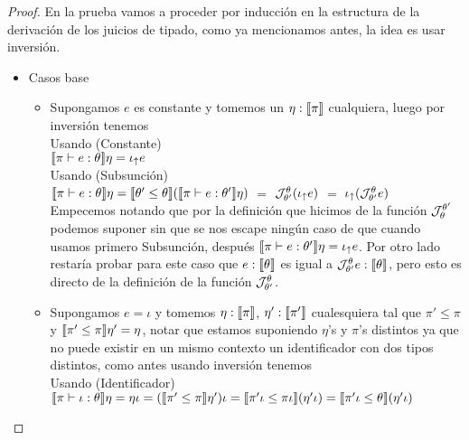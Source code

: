 \begin{proof}
En la prueba vamos a proceder por inducci\'on en la estructura de la derivaci\'on 
de los juicios de tipado, como ya mencionamos antes, la idea es usar inversi\'on.\\

\begin{itemize}

\item Casos base
\begin{itemize}
\item Supongamos $e$ es constante y tomemos un $\eta : \llbracket \pi \rrbracket$ cualquiera, 
luego por inversi\'on tenemos\\

Usando (Constante)\\

$\llbracket \pi \vdash e : \theta \rrbracket\eta = \iota_{\uparrow} e$\\

Usando (Subsunción)\\

$\llbracket \pi \vdash e : \theta \rrbracket\eta = 
\llbracket \theta' \leq \theta \rrbracket(\llbracket \pi \vdash e : \theta' \rrbracket\eta)$ $=$
$\mathcal{J}_{\theta'}^{\theta} (\iota_{\uparrow} e)$ $=$ $\iota_{\uparrow} (\mathcal{J}_{\theta'}^{\theta} e)$\\

Empecemos notando que por la definici\'on que hicimos de la funci\'on $\mathcal{J}_{\theta}^{\theta'}$
podemos suponer sin que se nos escape ning\'un caso de que cuando usamos primero
Subsunción, despu\'es $\llbracket \pi \vdash e : \theta' \rrbracket\eta = \iota_{\uparrow} e$. Por otro lado
restar\'ia probar para este caso que $e : \llbracket \theta \rrbracket$  es igual a 
$\mathcal{J}_{\theta'}^{\theta} e : \llbracket \theta \rrbracket$, pero esto es directo de la definici\'on
de la funci\'on $\mathcal{J}_{\theta'}^{\theta}$.\\

\item Supongamos $e = \iota$ y tomemos $\eta : \llbracket \pi \rrbracket$, $\eta' : \llbracket \pi' \rrbracket$
cualesquiera tal que $\pi' \leq \pi$ y $\llbracket \pi' \leq  \pi \rrbracket\eta' = \eta$, 
notar que estamos suponiendo $\eta$'s y $\pi$'s distintos ya que 
no puede existir en un mismo contexto un identificador con dos tipos distintos, como 
antes usando inversi\'on tenemos\\

Usando (Identificador)\\

$\llbracket \pi \vdash \iota : \theta \rrbracket\eta = \eta \iota = (\llbracket \pi' \leq \pi \rrbracket\eta')\iota = 
\llbracket \pi'\iota \leq \pi\iota \rrbracket(\eta' \iota) = \llbracket \pi'\iota \leq \theta \rrbracket(\eta' \iota)$\\


\end{itemize}
\end{itemize}
\end{proof}
